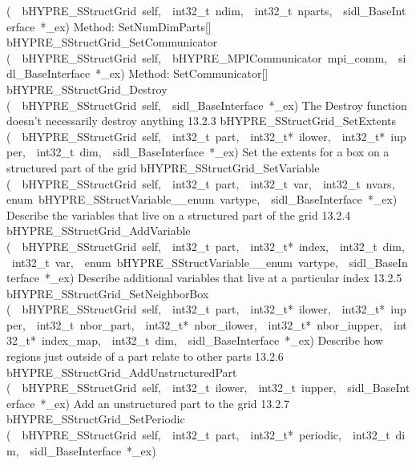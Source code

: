 \documentclass{article}
\begin{document}
\begin{cxxentry}
\begin{cxxentry}
\begin{cxxnames}
        {(\ \ bHYPRE\_SStructGrid\ self,\ \ int32\_t\ ndim,\ \ int32\_t\ nparts,\ \ sidl\_BaseInterface\ *\_ex)}
        {
Method:  SetNumDimParts[]}
        {}
\label{cxx.13.2.13}
        {bHYPRE\_SStructGrid\_SetCommunicator}
        {(\ \ bHYPRE\_SStructGrid\ self,\ \ bHYPRE\_MPICommunicator\ mpi\_comm,\ \ sidl\_BaseInterface\ *\_ex)}
        {
Method:  SetCommunicator[]}
        {}
\label{cxx.13.2.14}
        {bHYPRE\_SStructGrid\_Destroy}
        {(\ \ bHYPRE\_SStructGrid\ self,\ \ sidl\_BaseInterface\ *\_ex)}
        {
The Destroy function doesn't necessarily destroy anything}
        {13.2.3}
        {bHYPRE\_SStructGrid\_SetExtents}
        {(\ \ bHYPRE\_SStructGrid\ self,\ \ int32\_t\ part,\ \ int32\_t*\ ilower,\ \ int32\_t*\ iupper,\ \ int32\_t\ dim,\ \ sidl\_BaseInterface\ *\_ex)}
        {
Set the extents for a box on a structured part of the grid}
        {}
\label{cxx.13.2.15}
        {bHYPRE\_SStructGrid\_SetVariable}
        {(\ \ bHYPRE\_SStructGrid\ self,\ \ int32\_t\ part,\ \ int32\_t\ var,\ \ int32\_t\ nvars,\ \ enum\ bHYPRE\_SStructVariable\_\_enum\ vartype,\ \ sidl\_BaseInterface\ *\_ex)}
        {
Describe the variables that live on a structured part of the
grid}
        {13.2.4}
        {bHYPRE\_SStructGrid\_AddVariable}
        {(\ \ bHYPRE\_SStructGrid\ self,\ \ int32\_t\ part,\ \ int32\_t*\ index,\ \ int32\_t\ dim,\ \ int32\_t\ var,\ \ enum\ bHYPRE\_SStructVariable\_\_enum\ vartype,\ \ sidl\_BaseInterface\ *\_ex)}
        {
Describe additional variables that live at a particular
index}
        {13.2.5}
        {bHYPRE\_SStructGrid\_SetNeighborBox}
        {(\ \ bHYPRE\_SStructGrid\ self,\ \ int32\_t\ part,\ \ int32\_t*\ ilower,\ \ int32\_t*\ iupper,\ \ int32\_t\ nbor\_part,\ \ int32\_t*\ nbor\_ilower,\ \ int32\_t*\ nbor\_iupper,\ \ int32\_t*\ index\_map,\ \ int32\_t\ dim,\ \ sidl\_BaseInterface\ *\_ex)}
        {
Describe how regions just outside of a part relate to other
parts}
        {13.2.6}
        {bHYPRE\_SStructGrid\_AddUnstructuredPart}
        {(\ \ bHYPRE\_SStructGrid\ self,\ \ int32\_t\ ilower,\ \ int32\_t\ iupper,\ \ sidl\_BaseInterface\ *\_ex)}
        {
Add an unstructured part to the grid}
        {13.2.7}
        {bHYPRE\_SStructGrid\_SetPeriodic}
        {(\ \ bHYPRE\_SStructGrid\ self,\ \ int32\_t\ part,\ \ int32\_t*\ periodic,\ \ int32\_t\ dim,\ \ sidl\_BaseInterface\ *\_ex)}

\end{cxxnames}
\end{cxxentry}
\end{cxxentry}
\end{document}
